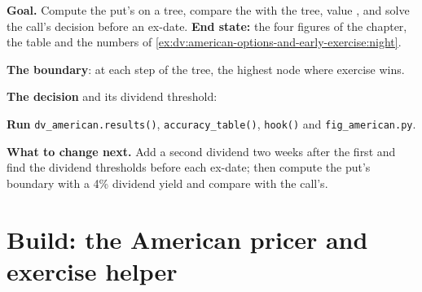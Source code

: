 \begin{tutorial}
\textbf{Goal.} Compute the put's  on a tree, compare the  with the tree, value , and solve the call's decision
before an ex-date. \textbf{End state:} the four figures of the chapter, the table and the
numbers of \cref{ex:dv:american-options-and-early-exercise:night}.
\begin{tutsteps}
\item \textbf{The boundary}: at each step of the tree, the highest node where exercise
wins.
\label{lst:dv:american-options-and-early-exercise:boundary}
\item \textbf{The decision} and its dividend threshold:
\label{lst:dv:american-options-and-early-exercise:decision}
\item \textbf{Run} \texttt{dv\_american.results()}, \texttt{accuracy\_table()},
\texttt{hook()} and \texttt{fig\_american.py}.
\end{tutsteps}
\textbf{What to change next.} Add a second dividend two weeks after the first and find the
dividend thresholds before each ex-date; then compute the put's boundary with a 4\%
dividend yield and compare with the call's.
\end{tutorial}

\section{Build: the American pricer and exercise helper}\label{bld:dv:american-options-and-early-exercise:american}


